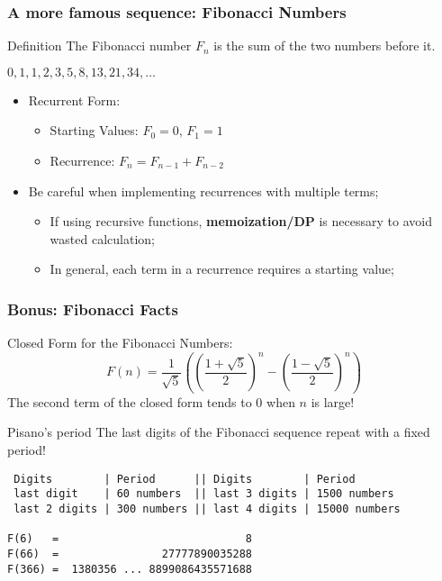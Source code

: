 \begin{frame}
  \frametitle{A more famous sequence: Fibonacci Numbers}

  \begin{block}{Definition}
    The Fibonacci number $F_n$ is the sum of the two numbers before it.\medskip

    $0, 1, 1, 2, 3, 5, 8, 13, 21, 34, \ldots$
  \end{block}\bigskip

  \begin{itemize}
    \item Recurrent Form:
    \begin{itemize}
      \item Starting Values: $F_0 = 0$, $F_1 = 1$
      \item Recurrence: $F_n = F_{n-1} + F_{n-2}$
    \end{itemize}\bigskip

    \item Be careful when implementing recurrences with multiple terms;
    \begin{itemize}
      \item If using recursive functions, {\bf memoization/DP} is necessary to avoid wasted calculation;
      \item In general, each term in a recurrence requires a starting value;
    \end{itemize}
  \end{itemize}
\end{frame}

\begin{frame}[fragile]
  \frametitle{Bonus: Fibonacci Facts}
  \begin{block}{Closed Form for the Fibonacci Numbers:}
    \begin{equation*}
      F(n) = \frac{1}{\sqrt{5}}\left(\left(\frac{1+\sqrt{5}}{2}\right)^n-\left(\frac{1-\sqrt{5}}{2}\right)^n\right)
    \end{equation*}
    The second term of the closed form tends to 0 when $n$ is large!
  \end{block}

  \begin{block}{Pisano's period}
    The last digits of the Fibonacci sequence repeat with a fixed period!\bigskip
{\smaller
\begin{verbatim}
 Digits        | Period      || Digits        | Period
 last digit    | 60 numbers  || last 3 digits | 1500 numbers
 last 2 digits | 300 numbers || last 4 digits | 15000 numbers

F(6)   =                             8
F(66)  =                27777890035288
F(366) =  1380356 ... 8899086435571688
\end{verbatim}}
  \end{block}
\end{frame}

